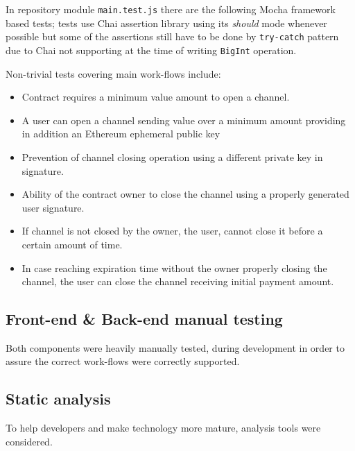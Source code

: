 \documentclass[12pt]{amsart}
\begin{document}
\begin{multicols}{2}
\vspace{0.35cm}

In repository\cite{state-channel-contract-a} module
\texttt{main.test.js} there are the following Mocha
framework\cite{mocha} based tests; tests use Chai assertion
library\cite{chai} using its \textit{should} mode whenever
possible but some of the assertions still have to be done
by \texttt{try-catch} pattern due to Chai not supporting
at the time of writing \texttt{BigInt} operation.

\vspace{0.35cm}

Non-trivial tests covering main work-flows include:
\begin{itemize}
\item Contract requires a minimum value amount to open a channel.
\item A user can open a channel sending value over a minimum amount providing
  in addition an Ethereum ephemeral public key
\item Prevention of channel closing operation using a different private key
  in signature.
\item Ability of the contract owner to close the channel using a properly
  generated user signature.
\item If channel is not closed by the owner, the user, cannot close it
  before a certain amount of time.
\item In case reaching expiration time without the owner properly closing the channel,
  the user can close the channel receiving initial payment amount.
\end{itemize}

\subsection{Front-end \& Back-end manual testing}

\vspace{0.35cm}

Both components were heavily manually tested, during development
in order to assure the correct work-flows were correctly supported.


\subsection{Static analysis}

\vspace{0.35cm}

To help developers and make technology more mature,
analysis tools\cite{ConsenSys19} were considered.


\end{multicols}
\end{document}
